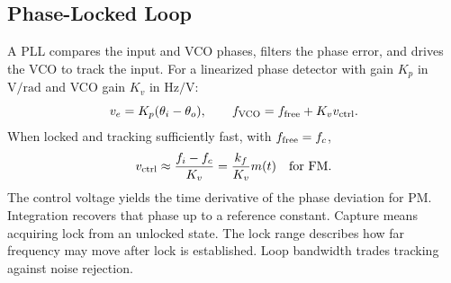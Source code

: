 \documentclass[12pt,a4paper]{article}
\begin{document}
\subsection{Phase-Locked Loop}
A PLL compares the input and VCO phases, filters the phase error, and drives the VCO to track the input. For a linearized phase detector with gain $K_p$ in $\mathrm{V/rad}$ and VCO gain $K_v$ in $\mathrm{Hz/V}$:
\[
 v_e=K_p(\theta_i-\theta_o),\qquad
 f_{\rm VCO}=f_{\rm free}+K_vv_{\rm ctrl}.
\]
When locked and tracking sufficiently fast, with $f_{\rm free}=f_c$,
\[
 v_{\rm ctrl}\approx\frac{f_i-f_c}{K_v}
                  =\frac{k_f}{K_v}m(t)\quad\text{for FM}.
\]
The control voltage yields the time derivative of the phase deviation for PM. Integration recovers that phase up to a reference constant. Capture means acquiring lock from an unlocked state. The lock range describes how far frequency may move after lock is established. Loop bandwidth trades tracking against noise rejection.

\begin{tcolorbox}[tikzbox, unbreakable, title={PLL Feedback and Demodulated Output}]
\centering
{}\par
\end{tcolorbox}
\end{document}
